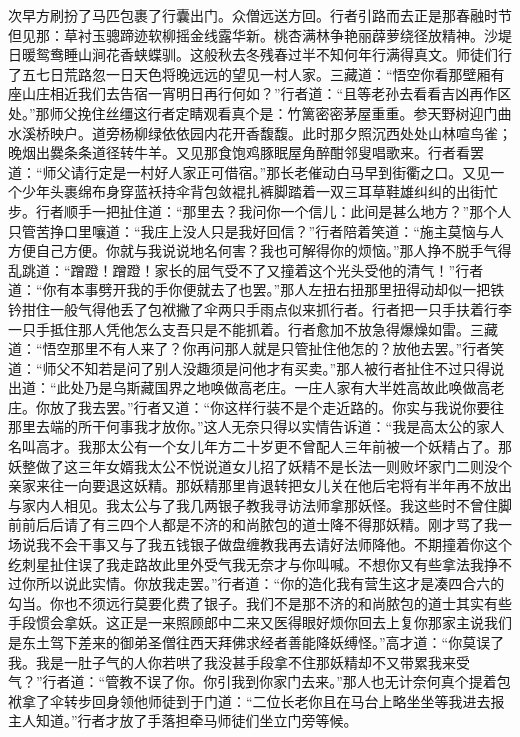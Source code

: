 \documentclass[12pt,UTF8]{ctexbook}
\begin{document}
{次早方刷扮了马匹包裹了行囊出门。众僧远送方回。行者引路而去正是那春融时节但见那：草衬玉骢蹄迹软柳摇金线露华新。桃杏满林争艳丽薜萝绕径放精神。沙堤日暖鸳鸯睡山涧花香蛱蝶驯。这般秋去冬残春过半不知何年行满得真文。师徒们行了五七日荒路忽一日天色将晚远远的望见一村人家。三藏道：“悟空你看那壁厢有座山庄相近我们去告宿一宵明日再行何如？”行者道：“且等老孙去看看吉凶再作区处。”那师父挽住丝缰这行者定睛观看真个是：竹篱密密茅屋重重。参天野树迎门曲水溪桥映户。道旁杨柳绿依依园内花开香馥馥。此时那夕照沉西处处山林喧鸟雀；晚烟出爨条条道径转牛羊。又见那食饱鸡豚眠屋角醉酣邻叟唱歌来。行者看罢道：“师父请行定是一村好人家正可借宿。”那长老催动白马早到街衢之口。又见一个少年头裹绵布身穿蓝袄持伞背包敛裩扎裤脚踏着一双三耳草鞋雄纠纠的出街忙步。行者顺手一把扯住道：“那里去？我问你一个信儿：此间是甚么地方？”那个人只管苦挣口里嚷道：“我庄上没人只是我好回信？”行者陪着笑道：“施主莫恼与人方便自己方便。你就与我说说地名何害？我也可解得你的烦恼。”那人挣不脱手气得乱跳道：“蹭蹬！蹭蹬！家长的屈气受不了又撞着这个光头受他的清气！”行者道：“你有本事劈开我的手你便就去了也罢。”那人左扭右扭那里扭得动却似一把铁钤拑住一般气得他丢了包袱撇了伞两只手雨点似来抓行者。行者把一只手扶着行李一只手抵住那人凭他怎么支吾只是不能抓着。行者愈加不放急得爆燥如雷。三藏道：“悟空那里不有人来了？你再问那人就是只管扯住他怎的？放他去罢。”行者笑道：“师父不知若是问了别人没趣须是问他才有买卖。”那人被行者扯住不过只得说出道：“此处乃是乌斯藏国界之地唤做高老庄。一庄人家有大半姓高故此唤做高老庄。你放了我去罢。”行者又道：“你这样行装不是个走近路的。你实与我说你要往那里去端的所干何事我才放你。”这人无奈只得以实情告诉道：“我是高太公的家人名叫高才。我那太公有一个女儿年方二十岁更不曾配人三年前被一个妖精占了。那妖整做了这三年女婿我太公不悦说道女儿招了妖精不是长法一则败坏家门二则没个亲家来往一向要退这妖精。那妖精那里肯退转把女儿关在他后宅将有半年再不放出与家内人相见。我太公与了我几两银子教我寻访法师拿那妖怪。我这些时不曾住脚前前后后请了有三四个人都是不济的和尚脓包的道士降不得那妖精。刚才骂了我一场说我不会干事又与了我五钱银子做盘缠教我再去请好法师降他。不期撞着你这个纥刺星扯住误了我走路故此里外受气我无奈才与你叫喊。不想你又有些拿法我挣不过你所以说此实情。你放我走罢。”行者道：“你的造化我有营生这才是凑四合六的勾当。你也不须远行莫要化费了银子。我们不是那不济的和尚脓包的道士其实有些手段惯会拿妖。这正是一来照顾郎中二来又医得眼好烦你回去上复你那家主说我们是东土驾下差来的御弟圣僧往西天拜佛求经者善能降妖缚怪。”高才道：“你莫误了我。我是一肚子气的人你若哄了我没甚手段拿不住那妖精却不又带累我来受气？”行者道：“管教不误了你。你引我到你家门去来。”那人也无计奈何真个提着包袱拿了伞转步回身领他师徒到于门道：“二位长老你且在马台上略坐坐等我进去报主人知道。”行者才放了手落担牵马师徒们坐立门旁等候。

}
\end{document}
